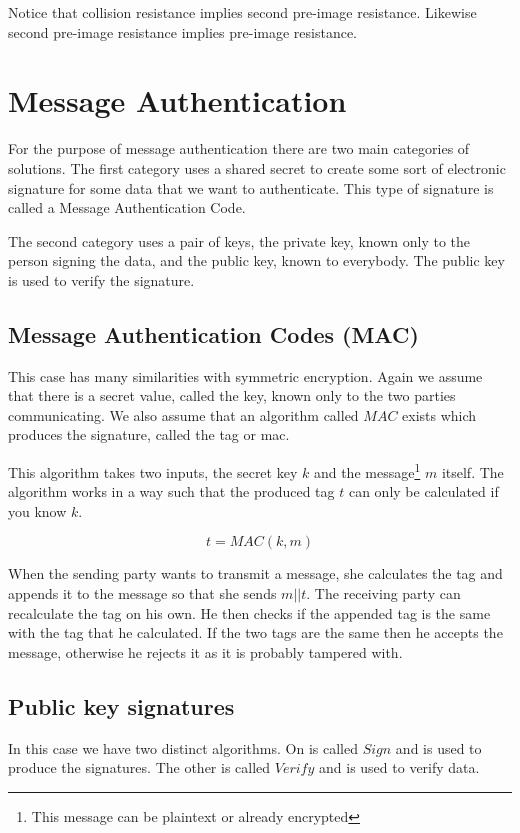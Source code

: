 Notice that collision resistance implies second pre-image resistance.
Likewise second pre-image resistance implies pre-image resistance.

\section{Message Authentication}

For the purpose of message authentication there are two main categories of solutions.
The first category uses a shared secret to create some sort of electronic signature for some data that we want to authenticate.
This type of signature is called a Message Authentication Code.

The second category uses a pair of keys, the private key, known only to the person signing the data, and the public key, known to everybody.
The public key is used to verify the signature.

\subsection{Message Authentication Codes (MAC)}

This case has many similarities with symmetric encryption.
Again we assume that there is a secret value, called the key, known only to the two parties communicating.
We also assume that an algorithm called $MAC$ exists which produces the signature, called the tag or mac.

This algorithm takes two inputs, the secret key $k$ and the message\footnote{This message can be plaintext or already encrypted} $m$ itself.
The algorithm works in a way such that the produced tag $t$ can only be calculated if you know $k$.

\[
  t = MAC(k, m)
\]

When the sending party wants to transmit a message, she calculates the tag and appends it to the message so that she sends $m||t$.
The receiving party can recalculate the tag on his own.
He then checks if the appended tag is the same with the tag that he calculated.
If the two tags are the same then he accepts the message, otherwise he rejects it as it is probably tampered with.

\subsection{Public key signatures}

In this case we have two distinct algorithms.
On is called $Sign$ and is used to produce the signatures.
The other is called $Verify$ and is used to verify data.

